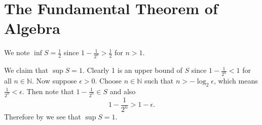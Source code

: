 \section{The Fundamental Theorem of Algebra}
\begin{questions}
    \item We note $\inf S = \frac12$ since $1 - \frac1{2^n} > 
    \frac12$ for $n > 1$.

    We claim that $\sup S = 1$. Clearly 1 is an upper bound of $S$ since $1 - \frac1{2^n} < 1$ for all $n \in \mathbb{N}$. Now suppose $\epsilon > 0$. Choose $n \in \mathbb{N}$ such that $n > -\log_2\epsilon$, which means $\frac1{2^n} < \epsilon$. Then note that $1 - \frac1{2^n} \in S$ and also
    \[
        1 - \frac1{2^n} > 1 - \epsilon.
    \]
    Therefore by  we see that $\sup S = 1$.
\end{questions}
